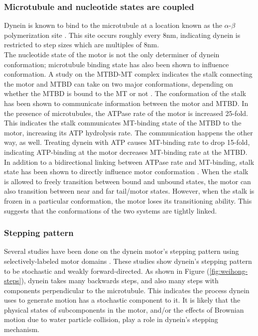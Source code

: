 \documentclass[10pt]{article} %
\begin{document}
\subsubsection{Microtubule and nucleotide states are coupled}
Dynein is known to bind to the microtubule at a location known as the $\alpha$-$\beta$ polymerization site \cite{redwineMTBDcomplex}. This site occurs roughly every 8nm, indicating dynein is restricted to step sizes which are multiples of 8nm.\\

The nucleotide state of the motor is not the only determiner of dynein conformation; microtubule binding state has also been shown to influence conformation. A study on the MTBD-MT complex indicates the stalk connecting the motor and MTBD can take on two major conformations, depending on whether the MTBD is bound to the MT or not \cite{mt-atp-coupling}. The conformation of the stalk has been shown to communicate information between the motor and MTBD. In the presence of microtubules, the ATPase rate of the motor is increased 25-fold. This indicates the stalk communicates MT-binding state of the MTBD to the motor, increasing its ATP hydrolysis rate. The communication happens the other way, as well. Treating dynein with ATP causes MT-binding rate to drop 15-fold, indicating ATP-binding at the motor decreases MT-binding rate at the MTBD.\\

In addition to a bidirectional linking between ATPase rate and MT-binding, stalk state has been shown to directly influence motor conformation \cite{mt-atp-coupling}. When the stalk is allowed to freely transition between bound and unbound states, the motor can also transition between near and far tail/motor states. However, when the stalk is frozen in a particular conformation, the motor loses its transitioning ability. This suggests that the conformations of the two systems are tightly linked.\\

\subsubsection{Stepping pattern}
Several studies have been done on the dynein motor's stepping pattern using selectively-labeled motor domains \cite{reck2006single} \cite{weihongpaper}. These studies show dynein's stepping pattern to be stochastic and weakly forward-directed. As shown in Figure (\ref{fig:weihong-steps}), dynein takes many backwards steps, and also many steps with components perpendicular to the microtubule. This indicates the process dynein uses to generate motion has a stochastic component to it. It is likely that the physical states of subcomponents in the motor, and/or the effects of Brownian motion due to water particle collision, play a role in dynein's stepping mechanism.\\
\end{document}
